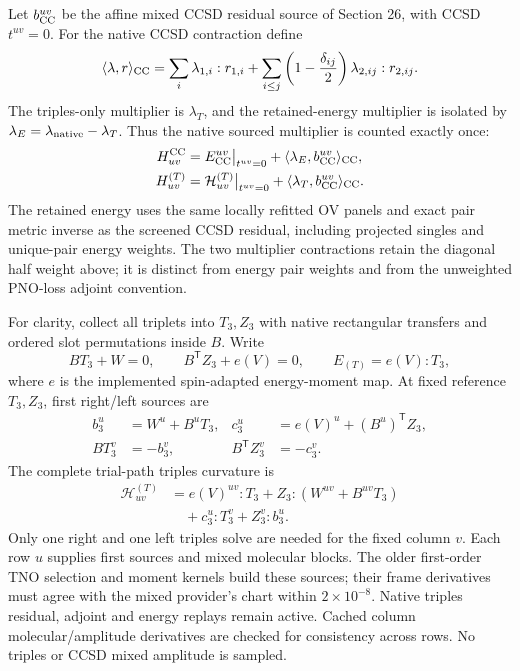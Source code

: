 \documentclass[11pt]{article}
\begin{document}
Let $b_{\rm CC}^{uv}$ be the affine mixed CCSD residual source of Section 26,
with CCSD $t^{uv}=0$. For the native CCSD contraction define
\begin{equation}
 \langle\lambda,r\rangle_{\rm CC}
 =\sum_i\lambda_{1,i}:r_{1,i}
   +\sum_{i\leq j}\left(1-\frac{\delta_{ij}}2\right)
       \lambda_{2,ij}:r_{2,ij}.
\end{equation}
The triples-only multiplier is $\lambda_T$, and the retained-energy
multiplier is isolated by $\lambda_E=\lambda_{\rm native}-\lambda_T$.
Thus the native sourced multiplier is counted exactly once:
\begin{align}
 H^{\rm CC}_{uv}
 &= E_{\rm CC}^{uv}\big|_{t^{uv}=0}
       +\langle\lambda_E,b_{\rm CC}^{uv}\rangle_{\rm CC},\\
 H^{(T)}_{uv}
 &=\mathcal H^{(T)}_{uv}\big|_{t^{uv}=0}
       +\langle\lambda_T,b_{\rm CC}^{uv}\rangle_{\rm CC}.
\end{align}
The retained energy uses the same locally refitted OV panels and exact
pair metric inverse as the screened CCSD residual, including projected
singles and unique-pair energy weights. The two multiplier contractions
retain the diagonal half weight above; it is distinct from energy pair
weights and from the unweighted PNO-loss adjoint convention.

For clarity, collect all triplets into $T_3,Z_3$ with native rectangular
transfers and ordered slot permutations inside $B$. Write
\begin{equation}
 BT_3+W=0,\qquad B^{\mathsf T}Z_3+e(V)=0,\qquad E_{(T)}=e(V):T_3,
\end{equation}
where $e$ is the implemented spin-adapted energy-moment map. At fixed
reference $T_3,Z_3$, first right/left sources are
\begin{align}
 b^u_3&=W^u+B^uT_3,& c^u_3&=e(V)^u+(B^u)^{\mathsf T}Z_3,\\
 BT_3^v&=-b^v_3,& B^{\mathsf T}Z_3^v&=-c^v_3.
\end{align}
The complete trial-path triples curvature is
\begin{align}
 \mathcal H^{(T)}_{uv}
 &=e(V)^{uv}:T_3+Z_3:(W^{uv}+B^{uv}T_3)\nonumber\\
 &\quad+c^u_3:T_3^v+Z_3^v:b^u_3.
 \label{eq:screened-triples-column}
\end{align}
Only one right and one left triples solve are needed for the fixed column
$v$. Each row $u$ supplies first sources and mixed molecular blocks.
The older first-order TNO selection and moment kernels build these sources;
their frame derivatives must agree with the mixed provider's chart within
$2\times10^{-8}$. Native triples residual, adjoint and energy replays remain
active. Cached column molecular/amplitude derivatives are checked for
consistency across rows. No triples or CCSD mixed amplitude is sampled.
\end{document}
